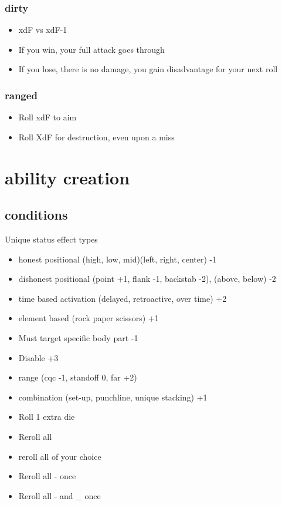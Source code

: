 \documentclass[10pt,letterpaper]{article}
\begin{document}
	\subsubsection{dirty}
	\begin{itemize}
		\item  xdF vs xdF-1
		\item  If you win, your full attack goes through
		\item  If you lose, there is no damage, you gain disadvantage for your next roll
	\end{itemize}
	\subsubsection{ranged}
	\begin{itemize}
		\item  Roll xdF to aim
		\item  Roll XdF for destruction, even upon a miss
	\end{itemize}
	\section{ability creation}
	\subsection{conditions}
	Unique status effect types 
	\begin{itemize}
		\item honest positional (high, low, mid)(left, right, center) -1
		\item dishonest positional (point +1, flank -1, backstab -2), (above, below) -2
		\item time based activation (delayed, retroactive, over time) +2
		\item element based (rock paper scissors) +1
		\item Must target specific body part -1
		\item Disable +3
		\item range (cqc -1, standoff 0, far +2)
		\item combination (set-up, punchline, unique stacking) +1
		
		\item Roll 1 extra die
		\item Reroll all
		\item reroll all of your choice
		\item Reroll all - once
		\item Reroll all - and \_ once
	\end{itemize}
	
\end{document}
